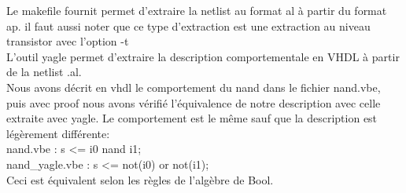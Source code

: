 \documentclass[12pt]{article}
\begin{document}
Le makefile fournit permet d'extraire la netlist au format al à partir du format ap. il faut aussi noter que ce type d'extraction est une extraction au niveau transistor avec l'option -t\\
L’outil yagle permet d'extraire la description comportementale en VHDL à partir de la netlist .al.\\
Nous avons décrit en vhdl le comportement du nand dans le fichier nand.vbe, puis avec proof nous avons vérifié l'équivalence de notre description avec celle extraite avec yagle. Le comportement est le même sauf que la description est légèrement différente: \\
nand.vbe : s <= i0 nand i1;\\
nand\_yagle.vbe :  s <= not(i0) or not(i1);\\
Ceci est équivalent selon les règles de l'algèbre de Bool.\\
\end{document}
